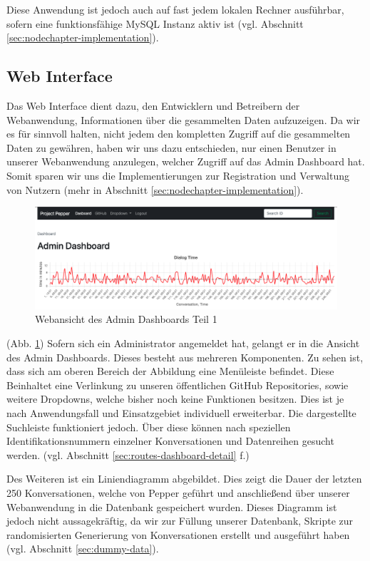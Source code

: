 Diese Anwendung ist jedoch auch auf fast jedem lokalen Rechner ausführbar, sofern eine funktionsfähige MySQL Instanz aktiv ist (vgl. Abschnitt \ref{sec:nodechapter-implementation}).

\subsection{Web Interface}
\label{sec:nodechapter-web-interface}
Das Web Interface dient dazu, den Entwicklern und Betreibern der Webanwendung, Informationen über die gesammelten Daten aufzuzeigen. Da wir es für sinnvoll halten, nicht jedem den kompletten Zugriff auf die gesammelten Daten zu gewähren, haben wir uns dazu entschieden, nur einen Benutzer in unserer Webanwendung anzulegen, welcher Zugriff auf das Admin Dashboard hat. Somit sparen wir uns die Implementierungen zur Registration und Verwaltung von Nutzern (mehr in Abschnitt \ref{sec:nodechapter-implementation}).\\


\begin{figure}[H]
    \includegraphics[width=\textwidth]{Figures/NodeChapter/adminDashboard1.png}
    \caption{Webansicht des Admin Dashboards Teil 1}
    \label{fig:admindashboard1}
    \centering
\end{figure}

(Abb. \ref{fig:admindashboard1}) Sofern sich ein Administrator angemeldet hat, gelangt er in die Ansicht des Admin Dashboards. Dieses besteht aus mehreren Komponenten. Zu sehen ist, dass sich am oberen Bereich der Abbildung eine Menüleiste befindet. Diese Beinhaltet eine Verlinkung zu unseren öffentlichen GitHub Repositories, sowie weitere Dropdowns, welche bisher noch keine Funktionen besitzen. Dies ist je nach Anwendungsfall und Einsatzgebiet individuell erweiterbar. Die dargestellte Suchleiste funktioniert jedoch. Über diese können nach speziellen Identifikationsnummern einzelner Konversationen und Datenreihen gesucht werden. (vgl. Abschnitt \ref{sec:routes-dashboard-detail} f.)

Des Weiteren ist ein Liniendiagramm abgebildet. Dies zeigt die Dauer der letzten 250 Konversationen, welche von Pepper geführt und anschließend über unserer Webanwendung in die Datenbank gespeichert wurden. Dieses Diagramm ist jedoch nicht aussagekräftig, da wir zur Füllung unserer Datenbank, Skripte zur randomisierten Generierung von Konversationen erstellt und ausgeführt haben (vgl. Abschnitt \ref{sec:dummy-data}).

